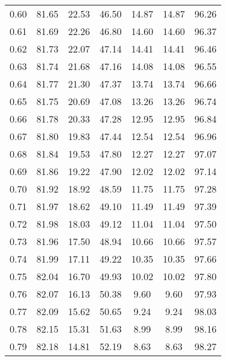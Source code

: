 \begin{tabular}{|c|c|c|c|c|c|c|}
      0.60 &     81.65 &     22.53 &      46.50 &   14.87 &      14.87 &         96.26 \\
      0.61 &     81.69 &     22.26 &      46.80 &   14.60 &      14.60 &         96.37 \\
      0.62 &     81.73 &     22.07 &      47.14 &   14.41 &      14.41 &         96.46 \\
      0.63 &     81.74 &     21.68 &      47.16 &   14.08 &      14.08 &         96.55 \\
      0.64 &     81.77 &     21.30 &      47.37 &   13.74 &      13.74 &         96.66 \\
      0.65 &     81.75 &     20.69 &      47.08 &   13.26 &      13.26 &         96.74 \\
      0.66 &     81.78 &     20.33 &      47.28 &   12.95 &      12.95 &         96.84 \\
      0.67 &     81.80 &     19.83 &      47.44 &   12.54 &      12.54 &         96.96 \\
      0.68 &     81.84 &     19.53 &      47.80 &   12.27 &      12.27 &         97.07 \\
      0.69 &     81.86 &     19.22 &      47.90 &   12.02 &      12.02 &         97.14 \\
      0.70 &     81.92 &     18.92 &      48.59 &   11.75 &      11.75 &         97.28 \\
      0.71 &     81.97 &     18.62 &      49.10 &   11.49 &      11.49 &         97.39 \\
      0.72 &     81.98 &     18.03 &      49.12 &   11.04 &      11.04 &         97.50 \\
      0.73 &     81.96 &     17.50 &      48.94 &   10.66 &      10.66 &         97.57 \\
      0.74 &     81.99 &     17.11 &      49.22 &   10.35 &      10.35 &         97.66 \\
      0.75 &     82.04 &     16.70 &      49.93 &   10.02 &      10.02 &         97.80 \\
      0.76 &     82.07 &     16.13 &      50.38 &    9.60 &       9.60 &         97.93 \\
      0.77 &     82.09 &     15.62 &      50.65 &    9.24 &       9.24 &         98.03 \\
      0.78 &     82.15 &     15.31 &      51.63 &    8.99 &       8.99 &         98.16 \\
      0.79 &     82.18 &     14.81 &      52.19 &    8.63 &       8.63 &         98.27 \\

\end{tabular}
